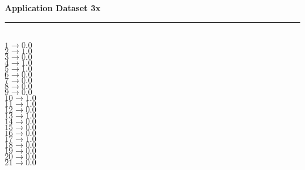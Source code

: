 \begin{enumerate}
\begin{enumerate}
				\bf{Application Dataset 3x} \\
				\noindent\rule{8cm}{0.4pt} \\
				\( 1 \rightarrow 0.0 \) \\
				\( 2 \rightarrow 1.0 \) \\
				\( 3 \rightarrow 0.0 \) \\
				\( 4 \rightarrow 1.0 \) \\
				\( 5 \rightarrow 1.0 \) \\
				\( 6 \rightarrow 0.0 \) \\
				\( 7 \rightarrow 0.0 \) \\
				\( 8 \rightarrow 0.0 \) \\
				\( 9 \rightarrow 0.0 \) \\
				\( 10 \rightarrow 1.0 \) \\
				\( 11 \rightarrow 1.0 \) \\
				\( 12 \rightarrow 0.0 \) \\
				\( 13 \rightarrow 1.0 \) \\
				\( 14 \rightarrow 0.0 \) \\
				\( 15 \rightarrow 0.0 \) \\
				\( 16 \rightarrow 0.0 \) \\
				\( 17 \rightarrow 1.0 \) \\
				\( 18 \rightarrow 0.0 \) \\
				\( 19 \rightarrow 0.0 \) \\
				\( 20 \rightarrow 0.0 \) \\
				\( 21 \rightarrow 0.0 \) \\
				

\end{enumerate}
\end{enumerate}

